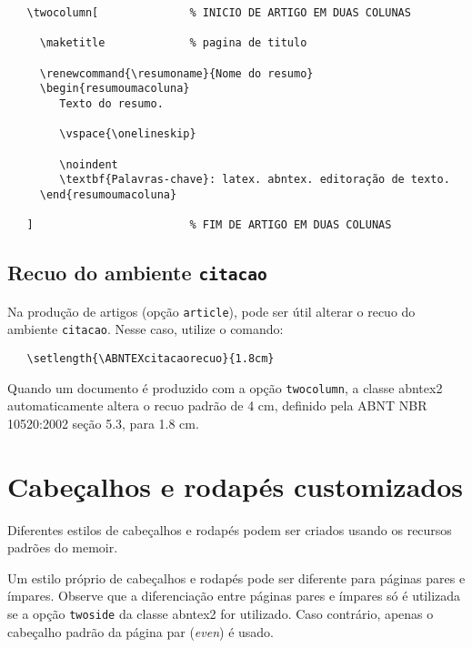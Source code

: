 \documentclass[
	article,			%
	12pt,				%
	oneside,			%
	a4paper,			%
	english,			%
	brazil,				%
	sumario=tradicional
	]{abntex2}
\begin{document}
\begin{verbatim}
   \twocolumn[              % INICIO DE ARTIGO EM DUAS COLUNAS

     \maketitle             % pagina de titulo

     \renewcommand{\resumoname}{Nome do resumo}
     \begin{resumoumacoluna}
        Texto do resumo.
      
        \vspace{\onelineskip}
 
        \noindent
        \textbf{Palavras-chave}: latex. abntex. editoração de texto.
     \end{resumoumacoluna}
   
   ]                        % FIM DE ARTIGO EM DUAS COLUNAS
\end{verbatim}

\subsection{Recuo do ambiente \texttt{citacao}}

Na produção de artigos (opção \texttt{article}), pode ser útil alterar o recuo
do ambiente \texttt{citacao}. Nesse caso, utilize o comando:

\begin{verbatim}
   \setlength{\ABNTEXcitacaorecuo}{1.8cm}
\end{verbatim}

Quando um documento é produzido com a opção \texttt{twocolumn}, a classe
\textsf{abntex2} automaticamente altera o recuo padrão de 4 cm, definido pela
ABNT NBR 10520:2002 seção 5.3, para 1.8 cm.

\section{Cabeçalhos e rodapés customizados}

Diferentes estilos de cabeçalhos e rodapés podem ser criados usando os
recursos padrões do \textsf{memoir}.

Um estilo próprio de cabeçalhos e rodapés pode ser diferente para páginas pares
e ímpares. Observe que a diferenciação entre páginas pares e ímpares só é
utilizada se a opção \texttt{twoside} da classe \textsf{abntex2} for utilizado.
Caso contrário, apenas o cabeçalho padrão da página par (\emph{even}) é usado.
\end{document}
